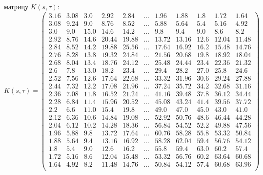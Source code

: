 \documentclass[12pt]{article}
\begin{document}
 матрицу $K(s,\tau)$:
\begin{equation*}
    K(s,\tau)=\left(
    \begin{array}{cccccccccccccccccccc}
3.16 & 3.08 & 3.0 & 2.92 & 2.84 & \ldots & 1.96 & 1.88 & 1.8 & 1.72 & 1.64 \\
3.08 & 9.24 & 9.0 & 8.76 & 8.52 & \ldots & 5.88 & 5.64 & 5.4 & 5.16 & 4.92 \\
3.0 & 9.0 & 15.0 & 14.6 & 14.2 & \ldots & 9.8 & 9.4 & 9.0 & 8.6 & 8.2 \\
2.92 & 8.76 & 14.6 & 20.44 & 19.88 & \ldots & 13.72 & 13.16 & 12.6 & 12.04 & 11.48 \\
2.84 & 8.52 & 14.2 & 19.88 & 25.56 & \ldots & 17.64 & 16.92 & 16.2 & 15.48 & 14.76 \\
2.76 & 8.28 & 13.8 & 19.32 & 24.84 & \ldots & 21.56 & 20.68 & 19.8 & 18.92 & 18.04 \\
2.68 & 8.04 & 13.4 & 18.76 & 24.12 & \ldots & 25.48 & 24.44 & 23.4 & 22.36 & 21.32 \\
2.6 & 7.8 & 13.0 & 18.2 & 23.4 & \ldots & 29.4 & 28.2 & 27.0 & 25.8 & 24.6 \\
2.52 & 7.56 & 12.6 & 17.64 & 22.68 & \ldots & 33.32 & 31.96 & 30.6 & 29.24 & 27.88 \\
2.44 & 7.32 & 12.2 & 17.08 & 21.96 & \ldots & 37.24 & 35.72 & 34.2 & 32.68 & 31.16 \\
2.36 & 7.08 & 11.8 & 16.52 & 21.24 & \ldots & 41.16 & 39.48 & 37.8 & 36.12 & 34.44 \\
2.28 & 6.84 & 11.4 & 15.96 & 20.52 & \ldots & 45.08 & 43.24 & 41.4 & 39.56 & 37.72 \\
2.2 & 6.6 & 11.0 & 15.4 & 19.8 & \ldots & 49.0 & 47.0 & 45.0 & 43.0 & 41.0 \\
2.12 & 6.36 & 10.6 & 14.84 & 19.08 & \ldots & 52.92 & 50.76 & 48.6 & 46.44 & 44.28 \\
2.04 & 6.12 & 10.2 & 14.28 & 18.36 & \ldots & 56.84 & 54.52 & 52.2 & 49.88 & 47.56 \\
1.96 & 5.88 & 9.8 & 13.72 & 17.64 & \ldots & 60.76 & 58.28 & 55.8 & 53.32 & 50.84 \\
1.88 & 5.64 & 9.4 & 13.16 & 16.92 & \ldots & 58.28 & 62.04 & 59.4 & 56.76 & 54.12 \\
1.8 & 5.4 & 9.0 & 12.6 & 16.2 & \ldots & 55.8 & 59.4 & 63.0 & 60.2 & 57.4 \\
1.72 & 5.16 & 8.6 & 12.04 & 15.48 & \ldots & 53.32 & 56.76 & 60.2 & 63.64 & 60.68 \\
1.64 & 4.92 & 8.2 & 11.48 & 14.76 & \ldots & 50.84 & 54.12 & 57.4 & 60.68 & 63.96 \\
    \end{array}
    \right)
\end{equation*}
\end{document}
